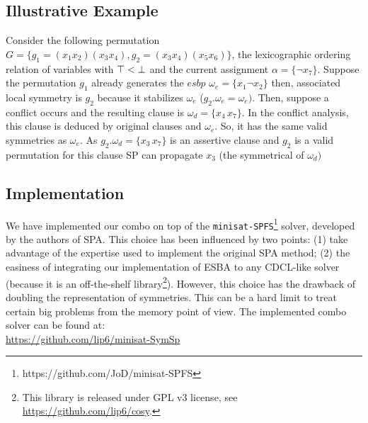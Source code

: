 \subsection{Illustrative Example}
Consider the following permutation $G = \{ g_1 = (x_1 x_2) (x_3 x_4)  , g_2 = (x_3 x_4) (x_5 x_6) \}$,
the lexicographic ordering relation of variables with $\top < \bot$ and 
the current assignment $\alpha = \{\neg x_7 \}$.
Suppose the permutation $g_1$ already generates the $esbp$ $\omega_e = \{ x_1 \neg x_2\}$ then, associated local symmetry is 
$g_2$ because it stabilizes $\omega_e$ ($g_2.\omega_e = \omega_e)$. Then, suppose a conflict occurs and the resulting clause is
$\omega_d = \{x_4\, x_7\}$. In the conflict analysis, this clause is deduced by original clauses and $\omega_e$.
 So, it has the same valid symmetries as $\omega_e$. As $g_2.\omega_d = \{x_3\, x_7\}$ is an assertive clause and $g_2$ is a valid 
 permutation for this clause SP can propagate $x_3$ (the symmetrical of $\omega_d)$

\subsection{Implementation}
We have implemented our combo on top of the
\texttt{minisat-SPFS}\footnote{https://github.com/JoD/minisat-SPFS} solver,
developed by the authors of SPA.
This choice has been influenced by two points: (1) take advantage of the
expertise used to implement the original SPA method; (2) the easiness of
integrating our implementation of ESBA to any CDCL-like solver (because it is an
off-the-shelf library\footnote{This library is released under GPL v3 license,
see \url{https://github.com/lip6/cosy}.}).
However, this choice has the drawback of doubling the representation of
symmetries. This can be a hard limit to treat certain big problems from the
memory point of view.
The implemented combo solver can be found at:\\
\mbox{\url{https://github.com/lip6/minisat-SymSp}}

